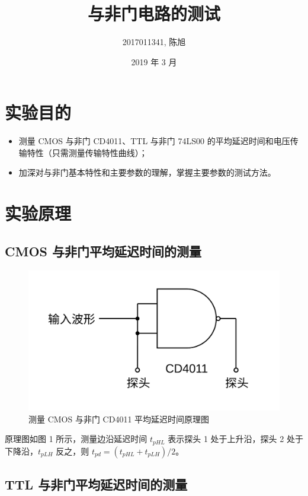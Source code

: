 \documentclass[a4paper]{article}
\title{与非门电路的测试}
\author{2017011341, 陈旭}
\date{2019 年 3 月}
\begin{document}
\maketitle

\section{实验目的}

    \begin{itemize}
        \item 测量 CMOS 与非门 CD4011、TTL 与非门 74LS00 的平均延迟时间和电压传输特性（只需测量传输特性曲线）；
        \item 加深对与非门基本特性和主要参数的理解，掌握主要参数的测试方法。
    \end{itemize}

\section{实验原理}

    \subsection{CMOS 与非门平均延迟时间的测量}
    
        \begin{figure}[H]
            \centering
            \includegraphics[width=0.7\linewidth]{figures/f1}
            \caption{测量 CMOS 与非门 CD4011 平均延迟时间原理图}
        \end{figure}

		\par 原理图如图 1 所示，测量边沿延迟时间 $t_{pHL}$ 表示探头 1 处于上升沿，探头 2 处于下降沿，$t_{pLH}$ 反之，则 $t_{pd}=(t_{pHL}+t_{pLH})/2$。

    \subsection{TTL 与非门平均延迟时间的测量}
\end{document}
